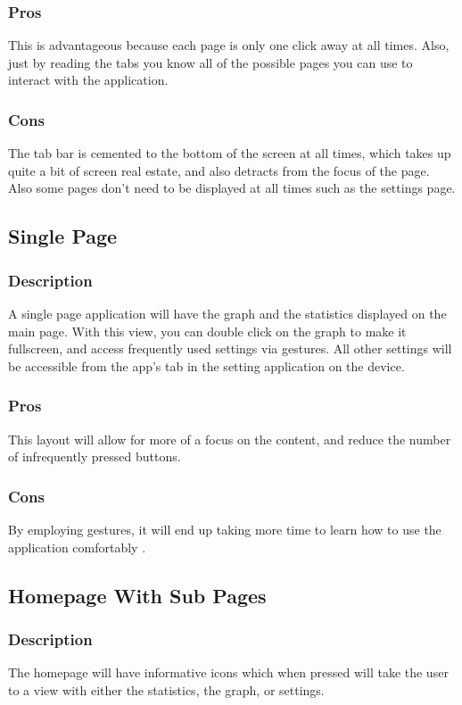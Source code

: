 \documentclass[onecolumn, draftclsnofoot,10pt, compsoc]{IEEEtran}
\begin{document}
\subsubsection*{Pros}
This is advantageous because each page is only one click away at all times.
Also, just by reading the tabs you know all of the possible pages you can use to interact with the application.

\subsubsection*{Cons}
The tab bar is cemented to the bottom of the screen at all times, which takes up quite a bit of screen real estate, and also detracts from the focus of the page.
Also some pages don't need to be displayed at all times such as the settings page.

\subsection{Single Page}
\subsubsection*{Description}
A single page application will have the graph and the statistics displayed on the main page.
With this view, you can double click on the graph to make it fullscreen, and access frequently used settings via gestures.
All other settings will be accessible from the app's tab in the setting application on the device.

\subsubsection*{Pros}
This layout will allow for more of a focus on the content, and reduce the number of infrequently pressed buttons.

\subsubsection*{Cons}
By employing gestures, it will end up taking more time to learn how to use the application comfortably .

\subsection{Homepage With Sub Pages}
\subsubsection*{Description}
The homepage will have informative icons which when pressed will take the user to a view with either the statistics, the graph, or settings.
\end{document}
